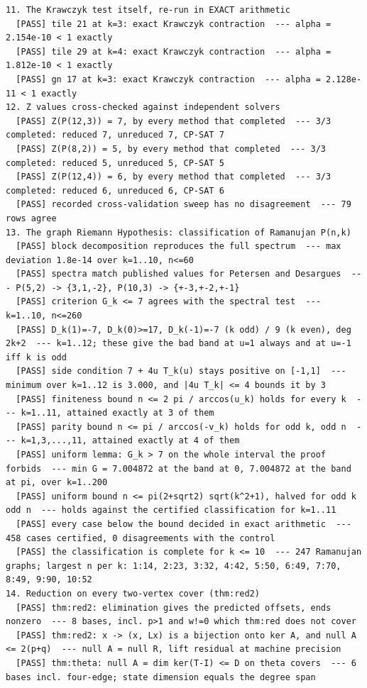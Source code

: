 \documentclass[11pt]{article}
\begin{document}
\begin{verbatim}
11. The Krawczyk test itself, re-run in EXACT arithmetic
  [PASS] tile 21 at k=3: exact Krawczyk contraction  --- alpha = 2.154e-10 < 1 exactly
  [PASS] tile 29 at k=4: exact Krawczyk contraction  --- alpha = 1.812e-10 < 1 exactly
  [PASS] gn 17 at k=3: exact Krawczyk contraction  --- alpha = 2.128e-11 < 1 exactly
12. Z values cross-checked against independent solvers
  [PASS] Z(P(12,3)) = 7, by every method that completed  --- 3/3 completed: reduced 7, unreduced 7, CP-SAT 7
  [PASS] Z(P(8,2)) = 5, by every method that completed  --- 3/3 completed: reduced 5, unreduced 5, CP-SAT 5
  [PASS] Z(P(12,4)) = 6, by every method that completed  --- 3/3 completed: reduced 6, unreduced 6, CP-SAT 6
  [PASS] recorded cross-validation sweep has no disagreement  --- 79 rows agree
13. The graph Riemann Hypothesis: classification of Ramanujan P(n,k)
  [PASS] block decomposition reproduces the full spectrum  --- max deviation 1.8e-14 over k=1..10, n<=60
  [PASS] spectra match published values for Petersen and Desargues  --- P(5,2) -> {3,1,-2}, P(10,3) -> {+-3,+-2,+-1}
  [PASS] criterion G_k <= 7 agrees with the spectral test  --- k=1..10, n<=260
  [PASS] D_k(1)=-7, D_k(0)>=17, D_k(-1)=-7 (k odd) / 9 (k even), deg 2k+2  --- k=1..12; these give the bad band at u=1 always and at u=-1 iff k is odd
  [PASS] side condition 7 + 4u T_k(u) stays positive on [-1,1]  --- minimum over k=1..12 is 3.000, and |4u T_k| <= 4 bounds it by 3
  [PASS] finiteness bound n <= 2 pi / arccos(u_k) holds for every k  --- k=1..11, attained exactly at 3 of them
  [PASS] parity bound n <= pi / arccos(-v_k) holds for odd k, odd n  --- k=1,3,...,11, attained exactly at 4 of them
  [PASS] uniform lemma: G_k > 7 on the whole interval the proof forbids  --- min G = 7.004872 at the band at 0, 7.004872 at the band at pi, over k=1..200
  [PASS] uniform bound n <= pi(2+sqrt2) sqrt(k^2+1), halved for odd k odd n  --- holds against the certified classification for k=1..11
  [PASS] every case below the bound decided in exact arithmetic  --- 458 cases certified, 0 disagreements with the control
  [PASS] the classification is complete for k <= 10  --- 247 Ramanujan graphs; largest n per k: 1:14, 2:23, 3:32, 4:42, 5:50, 6:49, 7:70, 8:49, 9:90, 10:52
14. Reduction on every two-vertex cover (thm:red2)
  [PASS] thm:red2: elimination gives the predicted offsets, ends nonzero  --- 8 bases, incl. p>1 and w!=0 which thm:red does not cover
  [PASS] thm:red2: x -> (x, Lx) is a bijection onto ker A, and null A <= 2(p+q)  --- null A = null R, lift residual at machine precision
  [PASS] thm:theta: null A = dim ker(T-I) <= D on theta covers  --- 6 bases incl. four-edge; state dimension equals the degree span

\end{verbatim}
\end{document}
